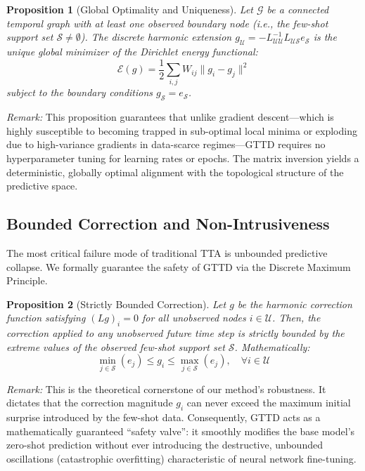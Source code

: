 \documentclass{article}
\newtheorem{proposition}{Proposition}
\begin{document}
\begin{proposition}[Global Optimality and Uniqueness]
Let $\mathcal{G}$ be a connected temporal graph with at least one observed boundary node (i.e., the few-shot support set $\mathcal{S} \neq \emptyset$). The discrete harmonic extension $g_{\mathcal{U}} = -L_{\mathcal{UU}}^{-1} L_{\mathcal{US}} e_{\mathcal{S}}$ is the unique global minimizer of the Dirichlet energy functional:
\begin{equation}
    \mathcal{E}(g) = \frac{1}{2}\sum_{i,j} W_{ij} \|g_i - g_j\|^2
\end{equation}
subject to the boundary conditions $g_{\mathcal{S}} = e_{\mathcal{S}}$.
\end{proposition}

\textit{Remark:} This proposition guarantees that unlike gradient descent---which is highly susceptible to becoming trapped in sub-optimal local minima or exploding due to high-variance gradients in data-scarce regimes---GTTD requires no hyperparameter tuning for learning rates or epochs. The matrix inversion yields a deterministic, globally optimal alignment with the topological structure of the predictive space.

\subsection{Bounded Correction and Non-Intrusiveness}

The most critical failure mode of traditional TTA is unbounded predictive collapse. We formally guarantee the safety of GTTD via the Discrete Maximum Principle.

\begin{proposition}[Strictly Bounded Correction]
Let $g$ be the harmonic correction function satisfying $(L g)_i = 0$ for all unobserved nodes $i \in \mathcal{U}$. Then, the correction applied to any unobserved future time step is strictly bounded by the extreme values of the observed few-shot support set $\mathcal{S}$. Mathematically:
\begin{equation}
    \min_{j \in \mathcal{S}} (e_j) \leq g_i \leq \max_{j \in \mathcal{S}} (e_j), \quad \forall i \in \mathcal{U}
\end{equation}
\end{proposition}

\textit{Remark:} This is the theoretical cornerstone of our method's robustness. It dictates that the correction magnitude $g_i$ can never exceed the maximum initial surprise introduced by the few-shot data. Consequently, GTTD acts as a mathematically guaranteed ``safety valve'': it smoothly modifies the base model's zero-shot prediction without ever introducing the destructive, unbounded oscillations (catastrophic overfitting) characteristic of neural network fine-tuning.
\end{document}
